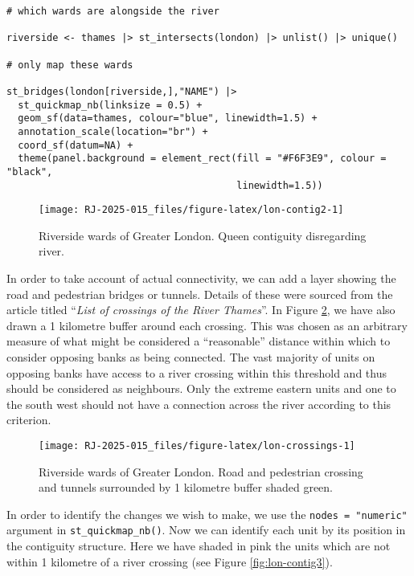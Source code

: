 \begin{verbatim}
# which wards are alongside the river

riverside <- thames |> st_intersects(london) |> unlist() |> unique()

# only map these wards

st_bridges(london[riverside,],"NAME") |>
  st_quickmap_nb(linksize = 0.5) +
  geom_sf(data=thames, colour="blue", linewidth=1.5) +
  annotation_scale(location="br") +
  coord_sf(datum=NA) +
  theme(panel.background = element_rect(fill = "#F6F3E9", colour = "black",
                                        linewidth=1.5))
\end{verbatim}

\begin{figure}

{\centering \texttt{[image: RJ-2025-015\_files/figure-latex/lon-contig2-1]} 

}

\caption{Riverside wards of Greater London. Queen contiguity disregarding river. }\label{fig:lon-contig2}
\end{figure}

In order to take account of actual connectivity, we can add a layer showing the road and pedestrian bridges or tunnels. Details of these were sourced from the \citet{wikicrossings} article titled ``\emph{List of crossings of the River Thames}''. In Figure \ref{fig:lon-crossings}, we have also drawn a 1 kilometre buffer around each crossing. This was chosen as an arbitrary measure of what might be considered a ``reasonable'' distance within which to consider opposing banks as being connected. The vast majority of units on opposing banks have access to a river crossing within this threshold and thus should be considered as neighbours. Only the extreme eastern units and one to the south west should not have a connection across the river according to this criterion.

\begin{figure}

{\centering \texttt{[image: RJ-2025-015\_files/figure-latex/lon-crossings-1]} 

}

\caption{Riverside wards of Greater London. Road and pedestrian crossing and tunnels surrounded by 1 kilometre buffer shaded green. }\label{fig:lon-crossings}
\end{figure}

In order to identify the changes we wish to make, we use the
\texttt{nodes\ =\ "numeric"} argument in \texttt{st\_quickmap\_nb()}. Now we can identify
each unit by its position in the contiguity structure. Here we have
shaded in pink the units which are not within 1 kilometre of a river
crossing (see Figure \ref{fig:lon-contig3}).

